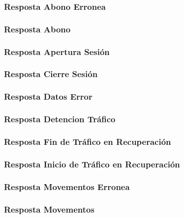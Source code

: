 \documentclass[a4paper,titlepage]{article}
\begin{document}
\subsubsection{Resposta Abono Erronea}

\subsubsection{Resposta Abono}

\subsubsection{Resposta Apertura Sesión}

\subsubsection{Resposta Cierre Sesión}

\subsubsection{Resposta Datos Error}

\subsubsection{Resposta Detencion Tráfico}

\subsubsection{Resposta Fin de Tráfico en Recuperación}

\subsubsection{Resposta Inicio de Tráfico en Recuperación}

\subsubsection{Resposta Movementos Erronea}

\subsubsection{Resposta Movementos}

\end{document}
